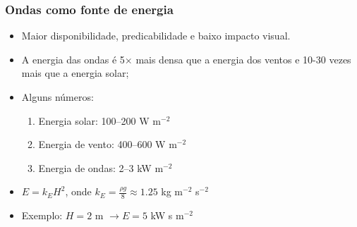\begin{frame}
    \frametitle{Ondas como fonte de energia}
        \footnotesize{
            \begin{itemize}[<+-| alert@+>]
                \item Maior disponibilidade, predicabilidade e baixo impacto
                      visual.
                \item A energia das ondas é 5$\times$ mais densa que a energia dos
                      ventos e 10-30 vezes mais que a energia solar;
                \item Alguns números:
                    \begin{enumerate}[<+-| alert@+>]
                        \item[] Energia solar: 100--200 W m$^{-2}$
                        \item[] Energia de vento: 400--600 W m$^{-2}$
                        \item[] Energia de ondas: 2--3 kW m$^{-2}$
                    \end{enumerate}
                \item $E = k_EH^2$, onde $k_E = \frac{\rho g}{8} \approx
                       1.25$ kg m$^{-2}$ s$^{-2}$
                \item Exemplo: $H = 2$ m $\rightarrow E = 5$ kW s m$^{-2}$
            \end{itemize}
            }
\end{frame}

